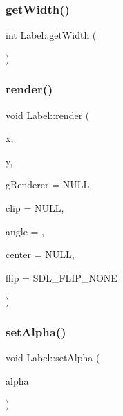 \mbox{\label{class_label_aa7686dcb66482c219458280ce0daede0}} 
\subsubsection{\texorpdfstring{get\+Width()}{getWidth()}}
{\footnotesize\ttfamily int Label\+::get\+Width (\begin{DoxyParamCaption}{ }\end{DoxyParamCaption})}

\mbox{\label{class_label_a2288557e88819810b73d4fed4791f0e9}} 
\subsubsection{\texorpdfstring{render()}{render()}}
{\footnotesize\ttfamily void Label\+::render (\begin{DoxyParamCaption}\item[{int}]{x,  }\item[{int}]{y,  }\item[{S\+D\+L\+\_\+\+Renderer $\ast$}]{g\+Renderer = {\ttfamily NULL},  }\item[{S\+D\+L\+\_\+\+Rect $\ast$}]{clip = {\ttfamily NULL},  }\item[{double}]{angle = {},  }\item[{S\+D\+L\+\_\+\+Point $\ast$}]{center = {\ttfamily NULL},  }\item[{S\+D\+L\+\_\+\+Renderer\+Flip}]{flip = {\ttfamily SDL\+\_\+FLIP\+\_\+NONE} }\end{DoxyParamCaption})}

\mbox{\label{class_label_a85c60678cb68784d27403bb552ef5447}} 
\subsubsection{\texorpdfstring{set\+Alpha()}{setAlpha()}}
{\footnotesize\ttfamily void Label\+::set\+Alpha (\begin{DoxyParamCaption}\item[{Uint8}]{alpha }\end{DoxyParamCaption})}

